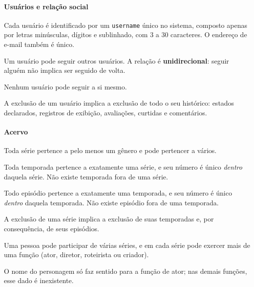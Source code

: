 \documentclass[a4paper,12pt,oneside,openany]{book}
\newcommand{\id}[1]{\texttt{#1}}
\begin{document}
\paragraph{Usuários e relação social}
\begin{description}[leftmargin=2.2cm,style=nextline,font=\normalfont\bfseries]
    \item[RN01] Cada usuário é identificado por um \id{username} único no sistema,
    composto apenas por letras minúsculas, dígitos e sublinhado, com 3 a 30
    caracteres. O endereço de e-mail também é único.
    \item[RN02] Um usuário pode seguir outros usuários. A relação é
    \textbf{unidirecional}: seguir alguém não implica ser seguido de volta.
    \item[RN03] Nenhum usuário pode seguir a si mesmo.
    \item[RN04] A exclusão de um usuário implica a exclusão de todo o seu
    histórico: estados declarados, registros de exibição, avaliações, curtidas e
    comentários.
\end{description}

\paragraph{Acervo}
\begin{description}[leftmargin=2.2cm,style=nextline,font=\normalfont\bfseries]
    \item[RN05] Toda série pertence a pelo menos um gênero e pode pertencer a
    vários.
    \item[RN06] Toda temporada pertence a exatamente uma série, e seu número é
    único \emph{dentro} daquela série. Não existe temporada fora de uma série.
    \item[RN07] Todo episódio pertence a exatamente uma temporada, e seu número é
    único \emph{dentro} daquela temporada. Não existe episódio fora de uma
    temporada.
    \item[RN08] A exclusão de uma série implica a exclusão de suas temporadas e,
    por consequência, de seus episódios.
    \item[RN09] Uma pessoa pode participar de várias séries, e em cada série pode
    exercer mais de uma função (ator, diretor, roteirista ou criador).
    \item[RN10] O nome do personagem só faz sentido para a função de ator; nas
    demais funções, esse dado é inexistente.
\end{description}
\end{document}
